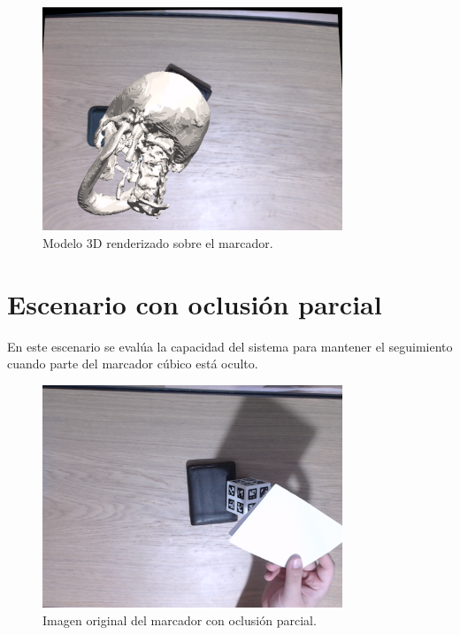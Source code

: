 \begin{figure}[H]
	\centering
	\includegraphics[width=0.8\textwidth]{imaxes/tilted_opengl_render.png}
	\caption{Modelo 3D renderizado sobre el marcador.}
	\label{fig:tilted_render}
\end{figure}

\section{Escenario con oclusión parcial}
\label{sec:ocluded}

En este escenario se evalúa la capacidad del sistema para mantener el seguimiento cuando parte del marcador cúbico está oculto.

\begin{figure}[H]
	\centering
	\includegraphics[width=0.8\textwidth]{imaxes/ocluded_raw_image.png}
	\caption{Imagen original del marcador con oclusión parcial.}
	\label{fig:ocluded_raw}
\end{figure}

